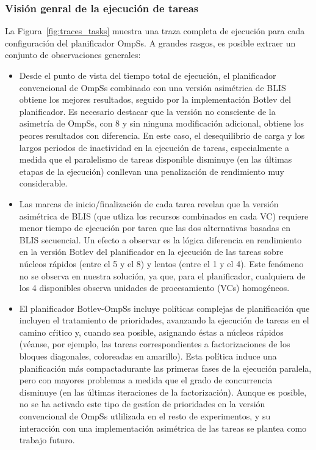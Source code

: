 \subsubsection{Visión genral de la ejecución de tareas}

La Figura~\ref{fig:traces_tasks} muestra una traza completa de ejecución para cada configuración del planificador OmpSs. A grandes rasgos, es posible
extraer un conjunto de observaciones generales:

\begin{itemize}
\item Desde el punto de vista del tiempo total de ejecución, el planificador convencional de OmpSs combinado con una versión asimétrica
	de BLIS obtiene los mejores resultados, seguido por la implementación Botlev del planificador. Es necesario destacar que
		la versión no consciente de la asimetría de OmpSs, con 8 \wt y sin ninguna modificación adicional, obtiene los peores
		resultados con diferencia. En este caso, el desequilibrio de carga y los largos periodos de inactividad en la
		ejecución de tareas, especialmente a medida que el paralelismo de tareas disponible disminuye (en las últimas etapas
		de la ejecución) conllevan una penalización de rendimiento muy considerable.

\item Las marcas de inicio/finalización de cada tarea revelan que la versión asimétrica de BLIS (que utliza los recursos combinados
	en cada VC) requiere menor tiempo de ejecución por tarea que las dos alternativas basadas en BLIS secuencial. Un efecto a observar
		es la lógica diferencia en rendimiento en la versión Botlev del planificador en la ejecución de las tareas sobre núcleos
		rápidos (\wts entre el 5 y el 8) y lentos (\wts entre el 1 y el 4). Este fenómeno no se observa en nuestra solución, ya
		que, para el planificador, cualquiera de los 4 \wts disponibles observa unidades de procesamiento (VCs) homogéneos.

\item El planificador Botlev-OmpSs incluye políticas complejas de planificación que incluyen el tratamiento de prioridades,
	avanzando la ejecución de tareas en el camino cŕitico y, cuando sea posible, asignando éstas a núcleos rápidos (véanse,
		por ejemplo, las tareas correspondientes a factorizaciones de los bloques diagonales, coloreadas en amarillo). Esta
		política induce una planificación más compactadurante las primeras fases de la ejecución paralela, pero 
		con mayores problemas a medida que el grado de concurrencia disminuye (en las últimas iteraciones de la 
		factorización). Aunque es posible, no se ha activado este tipo de gestíon de prioridades en la versión convencional
		de OmpSs utlilizada en el resto de experimentos, y su interacción con una implementación asimétrica de las tareas
		se plantea como trabajo futuro.
\end{itemize}


